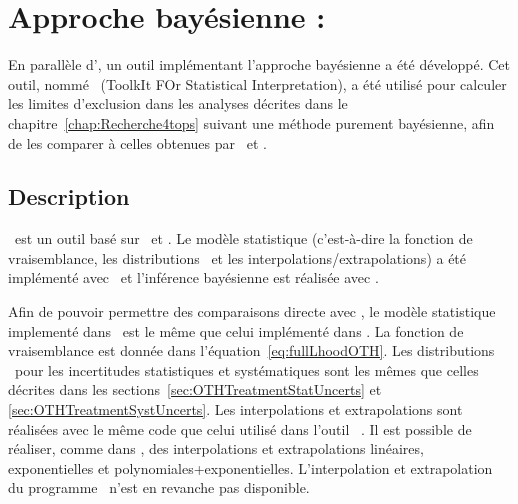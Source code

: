 \section{Approche bayésienne : \tifosi} 
\label{sec:tifosi}

En parall\`ele d'\opthylic, un outil impl\'ementant l'approche bay\'esienne a \'et\'e d\'evelopp\'e. 
Cet outil, nomm\'e \tifosi~(ToolkIt FOr Statistical Interpretation), a \'et\'e utilis\'e pour calculer les limites d'exclusion dans les analyses d\'ecrites dans le chapitre~\ref{chap:Recherche4tops} suivant une m\'ethode purement bay\'esienne, afin de les comparer \`a celles obtenues par \mclimit~et \opthylic.



\subsection{Description}

\tifosi~est un outil bas\'e sur \roofit~et \roostats. Le mod\`ele statistique (c'est-\`a-dire la fonction de vraisemblance, les distributions \prior~et les interpolations/extrapolations) a \'et\'e impl\'ement\'e avec \roofit~et l'inf\'erence bay\'esienne est r\'ealis\'ee avec \roostats. 

Afin de pouvoir permettre des comparaisons directe avec \opthylic, le mod\`ele statistique implement\'e dans \tifosi~est le m\^eme que celui impl\'ement\'e dans \opthylic. La fonction de vraisemblance est donn\'ee dans l'\'equation~\ref{eq:fullLhoodOTH}. Les distributions \prior~pour les incertitudes statistiques et syst\'ematiques sont les m\^emes que celles d\'ecrites dans les sections~\ref{sec:OTHTreatmentStatUncerts} et \ref{sec:OTHTreatmentSystUncerts}. Les interpolations et extrapolations sont r\'ealis\'ees avec le m\^eme code que celui utilis\'e dans l'outil \histfactory~\cite{Cranmer:1456844}. Il est possible de r\'ealiser, comme dans \opthylic, des interpolations et extrapolations lin\'eaires, exponentielles et polynomiales+exponentielles. L'interpolation et extrapolation du programme \mclimit~n'est en revanche pas disponible.

